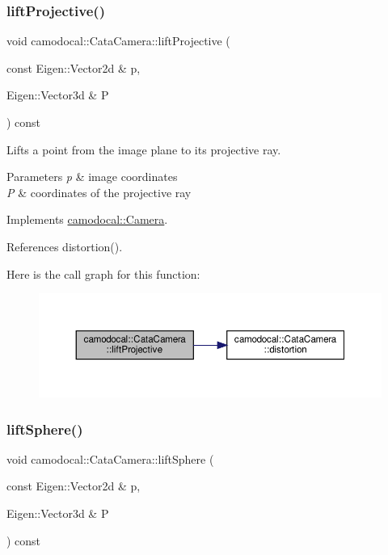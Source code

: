 \subsubsection{\texorpdfstring{lift\+Projective()}{liftProjective()}}
{\footnotesize\ttfamily void camodocal\+::\+Cata\+Camera\+::lift\+Projective (\begin{DoxyParamCaption}\item[{const Eigen\+::\+Vector2d \&}]{p,  }\item[{Eigen\+::\+Vector3d \&}]{P }\end{DoxyParamCaption}) const\hspace{0.3cm}{\ttfamily [virtual]}}



Lifts a point from the image plane to its projective ray. 


\begin{DoxyParams}{Parameters}
{\em p} & image coordinates \\
\hline
{\em P} & coordinates of the projective ray \\
\hline
\end{DoxyParams}


Implements \hyperlink{classcamodocal_1_1Camera_a680e97bfecab33cd833f914ee811d12d}{camodocal\+::\+Camera}.



References distortion().

Here is the call graph for this function\+:\nopagebreak
\begin{figure}[H]
\begin{center}
\leavevmode
\includegraphics[width=350pt]{classcamodocal_1_1CataCamera_a8415dca7d06b730a0b7358745aaa4001_cgraph}
\end{center}
\end{figure}
\mbox{\label{classcamodocal_1_1CataCamera_ad408a25dbeabac661788d16357b44504}} 
\subsubsection{\texorpdfstring{lift\+Sphere()}{liftSphere()}}
{\footnotesize\ttfamily void camodocal\+::\+Cata\+Camera\+::lift\+Sphere (\begin{DoxyParamCaption}\item[{const Eigen\+::\+Vector2d \&}]{p,  }\item[{Eigen\+::\+Vector3d \&}]{P }\end{DoxyParamCaption}) const\hspace{0.3cm}{\ttfamily [virtual]}}



